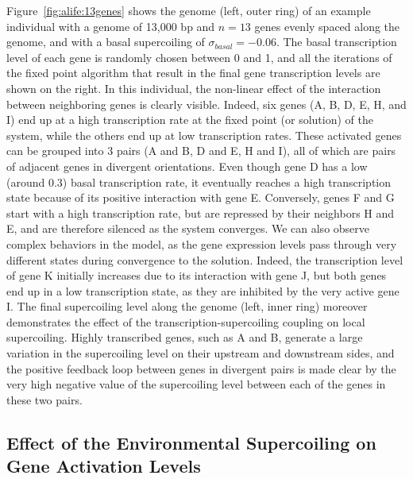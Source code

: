 Figure~\ref{fig:alife:13genes} shows the genome (left, outer ring) of an example individual with a genome of 13,000 bp and $n=13$ genes evenly spaced along the genome, and with a basal supercoiling of $\sigma_{basal} = -0.06$.
The basal transcription level of each gene is randomly chosen between 0 and 1, and all the iterations of the fixed point algorithm that result in the final gene transcription levels are shown on the right.
In this individual, the non-linear effect of the interaction between neighboring genes is clearly visible.
Indeed, six genes (A, B, D, E, H, and I) end up at a high transcription rate at the fixed point (or solution) of the system, while the others end up at low transcription rates.
These activated genes can be grouped into 3 pairs (A and B, D and E, H and I), all of which are pairs of adjacent genes in divergent orientations.
Even though gene D has a low (around 0.3) basal transcription rate, it eventually reaches a high transcription state because of its positive interaction with gene E.
Conversely, genes F and G start with a high transcription rate, but are repressed by their neighbors H and E, and are therefore silenced as the system converges.
We can also observe complex behaviors in the model, as the gene expression levels pass through very different states during convergence to the solution.
Indeed, the transcription level of gene K initially increases due to its interaction with gene J, but both genes end up in a low transcription state, as they are inhibited by the very active gene I.
The final supercoiling level along the genome (left, inner ring) moreover demonstrates the effect of the transcription-supercoiling coupling on local supercoiling.
Highly transcribed genes, such as A and B, generate a large variation in the supercoiling level on their upstream and downstream sides, and the positive feedback loop between genes in divergent pairs is made clear by the very high negative value of the supercoiling level between each of the genes in these two pairs.


\subsection{Effect of the Environmental Supercoiling on Gene Activation Levels}
\label{sec:alife:env_model}


